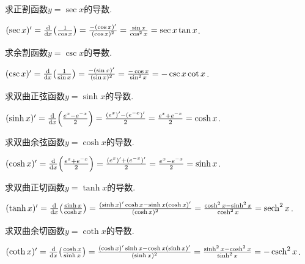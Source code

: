 \begin{example}%
求正割函数\(y=\sec x\)的导数.
\begin{solution}
\((\sec x)'
= \dv{x}(\frac1{\cos x})
= \frac{-(\cos x)'}{(\cos x)^2}
= \frac{\sin x}{\cos^2 x}
= \sec x \tan x\).
\end{solution}
\end{example}

\begin{example}%
求余割函数\(y=\csc x\)的导数.
\begin{solution}
\((\csc x)'
= \dv{x}(\frac1{\sin x})
= \frac{-(\sin x)'}{(\sin x)^2}
= \frac{-\cos x}{\sin^2 x}
= -\csc x \cot x\).
\end{solution}
\end{example}

\begin{example}%
求双曲正弦函数\(y = \sinh x\)的导数.
\begin{solution}
\((\sinh x)'
= \dv{x}(\frac{e^x - e^{-x}}2)
= \frac{(e^x)' - (e^{-x})'}2
= \frac{e^x + e^{-x}}2
= \cosh x\).
\end{solution}
\end{example}

\begin{example}%
求双曲余弦函数\(y = \cosh x\)的导数.
\begin{solution}
\((\cosh x)'
= \dv{x}(\frac{e^x + e^{-x}}2)
= \frac{(e^x)' + (e^{-x})'}2
= \frac{e^x - e^{-x}}2
= \sinh x\).
\end{solution}
\end{example}

\begin{example}%
求双曲正切函数\(y = \tanh x\)的导数.
\begin{solution}
\((\tanh x)'
= \dv{x}(\frac{\sinh x}{\cosh x})
= \frac{(\sinh x)' \cosh x - \sinh x (\cosh x)'}{(\cosh x)^2}
= \frac{\cosh^2 x - \sinh^2 x}{\cosh^2 x}
= \sech^2 x\).
\end{solution}
\end{example}

\begin{example}%
求双曲余切函数\(y = \coth x\)的导数.
\begin{solution}
\((\coth x)'
= \dv{x}(\frac{\cosh x}{\sinh x})
= \frac{(\cosh x)' \sinh x - \cosh x (\sinh x)'}{(\sinh x)^2}
= \frac{\sinh^2 x - \cosh^2 x}{\sinh^2 x}
= -\csch^2 x\).
\end{solution}
\end{example}

